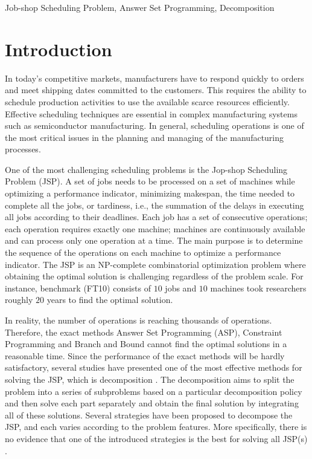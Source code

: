 \documentclass{tlp} %
\begin{document}
\begin{abstract}
\end{abstract}
%
\begin{keywords}
Job-shop Scheduling Problem, Answer Set Programming, Decomposition
\end{keywords}
%
%
\section{Introduction}
In today's competitive markets, manufacturers have to respond quickly to orders and meet shipping dates committed to the customers. This requires the ability to schedule production activities to use the available scarce resources efficiently. Effective scheduling techniques are essential in complex manufacturing systems such as semiconductor manufacturing. In general, scheduling operations is one of the most critical issues in the planning and managing of the manufacturing processes\cite{uzsoy2000performance}. 

One of the most challenging scheduling problems is the Jop-shop Scheduling Problem (JSP). A set of jobs needs to be processed on a set of machines while optimizing a performance indicator, minimizing makespan, the time needed to complete all the jobs, or tardiness, i.e., the summation of the delays in executing all jobs according to their deadlines. Each job has a set of consecutive operations; each operation requires exactly one machine; machines are continuously available and can process only one operation at a time. The main purpose is to determine the sequence of the operations on each machine to optimize a performance indicator. The JSP is an NP-complete combinatorial optimization problem where obtaining the optimal solution is challenging regardless of the problem scale\cite{garey1976complexity,lenstra1977complexity,liu2008prediction}. For instance, benchmark (FT10) consists of $10$ jobs and $10$ machines took researchers roughly $20$ years to find the optimal solution\cite{adams1988shifting,zhang2010hybrid}.

In reality, the number of operations is reaching thousands of operations. Therefore, the exact methods Answer Set Programming (ASP), Constraint Programming and Branch and Bound cannot find the optimal solutions in a reasonable time\cite{daneshamooz2021mathematical,shi2021solving,francescutto2021solving}. Since the performance of the exact methods will be hardly satisfactory, several studies have presented one of the most effective methods for solving the JSP, which is decomposition \cite{zhang2010hybrid}. The decomposition aims to split the problem into a series of subproblems based on a particular decomposition policy and then solve each part separately and obtain the final solution by integrating all of these solutions. Several strategies have been proposed to decompose the JSP, and each varies according to the problem features. More specifically, there is no evidence that one of the introduced strategies is the best for solving all JSP(s) \cite{ovacik2012decomposition}. 
\end{document}
